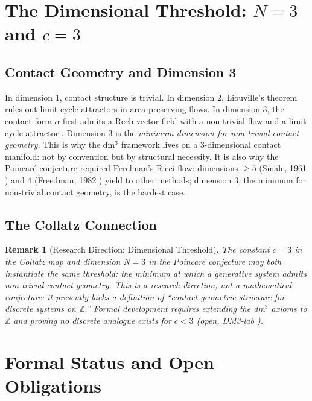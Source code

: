 \documentclass[14pt,a4paper]{extarticle}
\newtheorem{remark}{Remark}[section]
\begin{document}
\section{The Dimensional Threshold: $N = 3$ and $c = 3$}
\label{sec:threshold}

\subsection{Contact Geometry and Dimension 3}

In dimension 1, contact structure is trivial.
In dimension 2, Liouville's theorem rules out limit cycle attractors
in area-preserving flows.
In dimension 3, the contact form $\alpha$ first admits a Reeb vector
field with a non-trivial flow and a limit cycle attractor
\cite{Geiges2008}.
Dimension 3 is the \emph{minimum dimension for non-trivial contact
geometry}.
This is why the dm$^3$ framework lives on a 3-dimensional contact
manifold: not by convention but by structural necessity.
It is also why the Poincar\'e conjecture required Perelman's
Ricci flow: dimensions $\geq 5$ (Smale, 1961 \cite{Smale1961})
and $4$ (Freedman, 1982 \cite{Freedman1982}) yield to other methods;
dimension 3, the minimum for non-trivial contact geometry, is the
hardest case.

\subsection{The Collatz Connection}

\begin{remark}[Research Direction: Dimensional Threshold]
\label{conj:threshold}
The constant $c=3$ in the Collatz map and dimension $N=3$ in the
Poincar\'e conjecture may both instantiate the same threshold: the
minimum at which a generative system admits non-trivial contact
geometry.
This is a \emph{research direction}, not a mathematical conjecture:
it presently lacks a definition of ``contact-geometric structure for
discrete systems on $\mathbb{Z}$.''
Formal development requires extending the dm$^3$ axioms to $\mathbb{Z}$
and proving no discrete analogue exists for $c<3$ (open, DM3-lab \cite{DM3lab2026}).
\end{remark}

\section{Formal Status and Open Obligations}
\label{sec:status}
\end{document}
